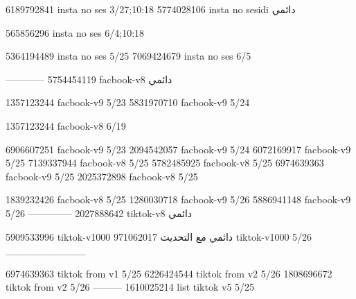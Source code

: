 
6189792841 insta no ses
3/27;10:18
5774028106 insta no sesidi
دائمي


565856296 insta no ses
6/4;10:18


5364194489 insta no ses
5/25
7069424679 insta no ses
6/5

------------
5754454119 facbook-v8
دائمي


1357123244 facbook-v9
5/23
5831970710 facbook-v9
5/24

1357123244 facbook-v8
6/19

6906607251 facbook-v9
5/23
2094542057 facbook-v9
5/24
6072169917 facbook-v9
5/25
7139337944 facbook-v8
5/25
5782485925 facbook-v8
5/25
6974639363 facbook-v9
5/25
2025372898 facbook-v8
5/25

1839232426 facbook-v8
5/25
1280030718 facbook-v9
5/26
5886941148 facbook-v9
5/26
--------------
2027888642 tiktok-v8
دائمي

5909533996 tiktok-v1000
دائمي مع التحديث
971062017 tiktok-v1000
5/26
___________

6974639363 tiktok from v1
5/25
6226424544 tiktok from v2
5/26
1808696672 tiktok from v2
5/26
---------
1610025214 list tiktok v5
5/25
